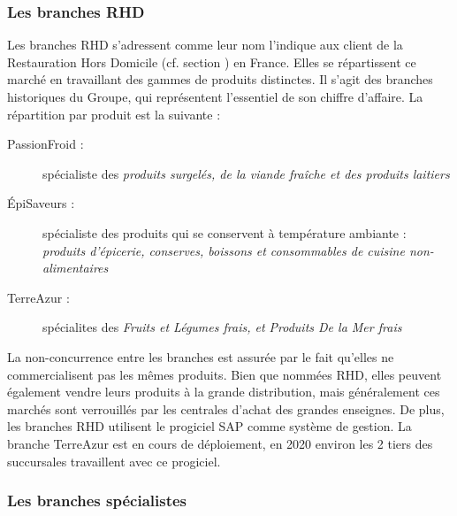                 \subsubsection{Les branches RHD}
                
                Les branches RHD s'adressent comme leur nom l'indique aux client de la Restauration Hors Domicile (cf. section ) en France.
                Elles se répartissent ce marché en travaillant des gammes de produits distinctes.
                Il s'agit des branches historiques du Groupe, qui représentent l'essentiel de son chiffre d'affaire.
                La répartition par produit est la suivante :
                \begin{description}
                    \item[PassionFroid :] spécialiste des \emph{produits surgelés, de la viande fraîche et des produits laitiers}
                    \item[\'{E}piSaveurs :] spécialiste des produits qui se conservent à température ambiante : \emph{produits d'épicerie, conserves, boissons et consommables de cuisine non-alimentaires}
                    \item[TerreAzur :] spécialites des \emph{Fruits et Légumes frais, et Produits De la Mer frais} 
                \end{description}
                La non-concurrence entre les branches est assurée par le fait qu'elles ne commercialisent pas les mêmes produits.
                Bien que nommées RHD, elles peuvent également vendre leurs produits à la grande distribution, mais généralement ces marchés sont verrouillés par les centrales d'achat des grandes enseignes.
                De plus, les branches RHD utilisent le progiciel SAP comme système de gestion.
                La branche TerreAzur est en cours de déploiement, en 2020 environ les 2 tiers des succursales travaillent avec ce progiciel.

                \subsubsection{Les branches spécialistes}

